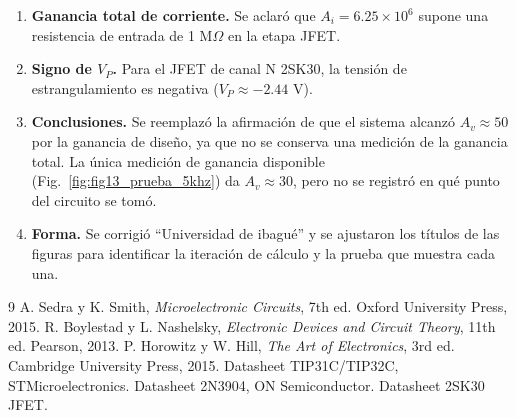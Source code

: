 \documentclass[10pt,twocolumn,letterpaper]{article}
\begin{document}
\begin{enumerate}[leftmargin=1.4em]
\item \textbf{Ganancia total de corriente.} Se aclaró que \(A_i = 6.25 \times 10^6\) supone una resistencia de entrada de 1 M\(\Omega\) en la etapa JFET.
\item \textbf{Signo de \(V_P\).} Para el JFET de canal N 2SK30, la tensión de estrangulamiento es negativa (\(V_P \approx -2.44\) V).
\item \textbf{Conclusiones.} Se reemplazó la afirmación de que el sistema alcanzó \(A_v \approx 50\) por la ganancia de diseño, ya que no se conserva una medición de la ganancia total. La única medición de ganancia disponible (Fig.~\ref{fig:fig13_prueba_5khz}) da \(A_v \approx 30\), pero no se registró en qué punto del circuito se tomó.
\item \textbf{Forma.} Se corrigió ``Universidad de ibagué'' y se ajustaron los títulos de las figuras para identificar la iteración de cálculo y la prueba que muestra cada una.
\end{enumerate}

\begin{thebibliography}{9}\footnotesize
{} A. Sedra y K. Smith, \emph{Microelectronic Circuits}, 7th ed. Oxford University Press, 2015.
 R. Boylestad y L. Nashelsky, \emph{Electronic Devices and Circuit Theory}, 11th ed. Pearson, 2013.
 P. Horowitz y W. Hill, \emph{The Art of Electronics}, 3rd ed. Cambridge University Press, 2015.
 Datasheet TIP31C/TIP32C, STMicroelectronics.
 Datasheet 2N3904, ON Semiconductor.
 Datasheet 2SK30 JFET.
\end{thebibliography}
\end{document}
